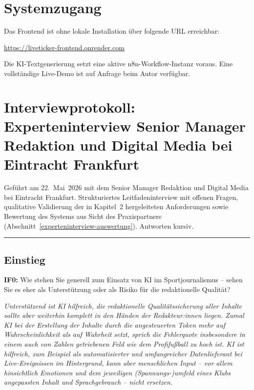 \chapter{Systemzugang}\label{systemzugang}

Das Frontend ist ohne lokale Installation über folgende URL erreichbar:

\begin{center}
\url{https://liveticker-frontend.onrender.com}
\end{center}

\noindent Die KI-Textgenerierung setzt eine aktive n8n-Workflow-Instanz voraus. Eine vollständige Live-Demo ist auf Anfrage beim Autor verfügbar.

\chapter[Interviewprotokoll]{Interviewprotokoll: Experteninterview Senior Manager Redaktion und Digital Media bei Eintracht Frankfurt}\label{interviewleitfaden-experteninterview-sportredakteur-eintracht-frankfurt}

Geführt am 22.~Mai~2026 mit dem Senior Manager Redaktion und Digital Media bei Eintracht Frankfurt. Strukturiertes Leitfadeninterview mit offenen Fragen, qualitative Validierung der in Kapitel~2 hergeleiteten Anforderungen sowie Bewertung des Systems aus Sicht des Praxispartners (Abschnitt~\ref{experteninterview-auswertung}). Antworten kursiv.

\begin{center}\rule{0.5\linewidth}{0.5pt}\end{center}

\section{Einstieg}

\textbf{IF0:} Wie stehen Sie generell zum Einsatz von KI im Sportjournalismus -- sehen Sie es eher als Unterstützung oder als Risiko für die redaktionelle Qualität?

\textit{Unterstützend ist KI hilfreich, die redaktionelle Qualitätssicherung aller Inhalte sollte aber weiterhin komplett in den Händen der Redakteur:innen liegen. Zumal KI bei der Erstellung der Inhalte durch die angesteuerten Token mehr auf Wahrscheinlichkeit als auf Wahrheit setzt, sprich die Fehlerquote insbesondere in einem auch von Zahlen getriebenen Feld wie dem Profifußball zu hoch ist. KI ist hilfreich, zum Beispiel als automatisierter und umfangreicher Datenlieferant bei Live-Ereignissen im Hintergrund, kann aber menschlichen Input -- vor allem hinsichtlich Emotionen und dem jeweiligen (Spannungs-)umfeld eines Klubs angepassten Inhalt und Sprachgebrauch -- nicht ersetzen.}

